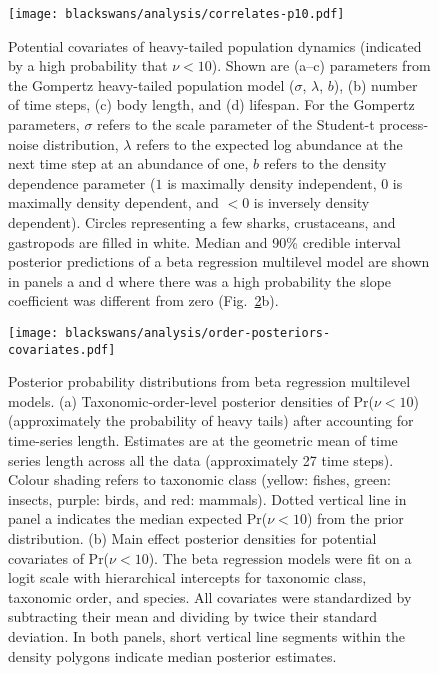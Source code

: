 \begin{figure}[htbp]
\begin{center}
\texttt{[image: blackswans/analysis/correlates-p10.pdf]}

\caption[Potential covariates of heavy-tailed population dynamics (indicated
  by a high probability that $\nu < 10$).]{Potential covariates of heavy-tailed population dynamics (indicated
  by a high probability that $\nu < 10$). Shown are (a--c) parameters from the
  Gompertz heavy-tailed population model ($\sigma$, $\lambda$, $b$), (b)
  number of time steps, (c) body length, and (d) lifespan. For the Gompertz
  parameters, $\sigma$ refers to the scale parameter of the Student-t
  process-noise distribution, $\lambda$ refers to the expected log abundance
  at the next time step at an abundance of one, $b$ refers to the density
  dependence parameter ($1$ is maximally density independent, $0$ is maximally
  density dependent, and $<0$ is inversely density dependent). Circles
  representing a few sharks, crustaceans, and gastropods are filled in white.
  Median and 90\% credible interval posterior predictions of a beta regression
  multilevel model are shown in panels a and d where there was a high
  probability the slope coefficient was different from zero
  (Fig.~\ref{fig:posteriors}b).}

\label{fig:correlates}
\end{center}
\end{figure}

\begin{figure}[htbp]
\begin{center}
\texttt{[image: blackswans/analysis/order-posteriors-covariates.pdf]}

\caption[Posterior probability distributions from beta regression multilevel
  models.]{Posterior probability distributions from beta regression multilevel
  models. (a) Taxonomic-order-level posterior densities of Pr($\nu < 10$)
  (approximately the probability of heavy tails) after accounting for
  time-series length. Estimates are at the geometric mean of time series
  length across all the data (approximately 27 time steps). Colour shading
  refers to taxonomic class (yellow: fishes, green: insects, purple: birds,
  and red: mammals). Dotted vertical line in panel a indicates the median
  expected Pr($\nu < 10$) from the prior distribution. (b) Main effect
  posterior densities for potential covariates of Pr($\nu < 10$). The beta
  regression models were fit on a logit scale with hierarchical intercepts for
  taxonomic class, taxonomic order, and species. All covariates were
  standardized by subtracting their mean and dividing by twice their standard
  deviation. In both panels, short vertical line segments within the density
  polygons indicate median posterior estimates.}

\label{fig:posteriors}
\end{center}
\end{figure}
